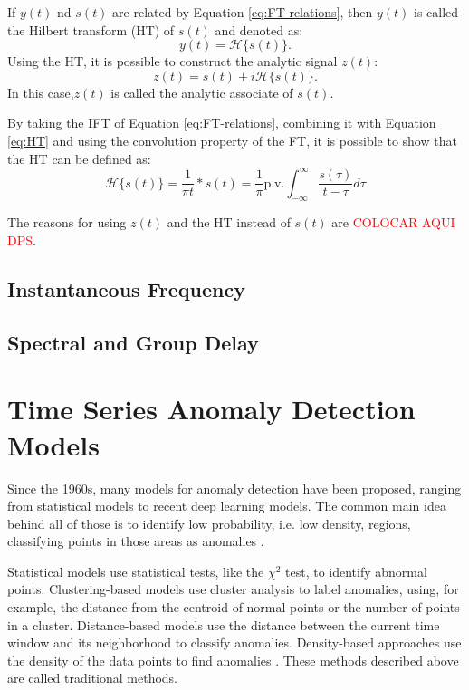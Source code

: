 If $y(t)$ nd $s(t)$ are related by Equation \ref{eq:FT-relations}, then $y(t)$ is called the Hilbert transform (HT) of $s(t)$ and denoted as:
\begin{equation}
    y(t) = \mathcal{H}\{s(t)\}.
    \label{eq:HT}
\end{equation}
\noindent Using the HT, it is possible to construct the analytic signal $z(t)$:
\begin{equation}
    z(t) = s(t) + i\mathcal{H}\{s(t)\}.
\end{equation}
\noindent In this case,$z(t)$ is called the analytic associate of $s(t)$. 

By taking the IFT of Equation \ref{eq:FT-relations}, combining it with Equation \ref{eq:HT} and using the convolution property of the FT, it is possible to show that the HT can be defined as:
\begin{equation}
    \mathcal{H}\{s(t)\} = \frac{1}{\pi t} * s(t) 
    = \frac{1}{\pi} \text{p.v.} \int_{-\infty}^{\infty} \frac{s(\tau)}{t-\tau} d\tau
    \label{eq:HT-definition}
\end{equation} 

The reasons for using $z(t)$ and the HT instead of $s(t)$ are \textcolor{red}{COLOCAR AQUI DPS}.

\subsection{Instantaneous Frequency}\label{sec-IF}



\subsection{Spectral and Group Delay}\label{sec-spectral-group-delay}

\section{Time Series Anomaly Detection Models} \label{sec-model-basics}

Since the 1960s, many models for anomaly detection have been proposed, ranging from statistical models to recent deep learning models. The common main idea behind all of those is to identify low probability, i.e. low density, regions, classifying points in those areas as anomalies \cite{Samariya_Thakkar_2021}. 

Statistical models use statistical tests, like the $\chi^2$ test, to identify abnormal points. Clustering-based models use cluster analysis to label anomalies, using, for example, the distance from the centroid of normal points or the number of points in a cluster. Distance-based models use the distance between the current time window and its neighborhood to classify anomalies. Density-based approaches use the density of the data points to find anomalies \cite{Samariya_Thakkar_2021}. These methods described above are called traditional methods.

